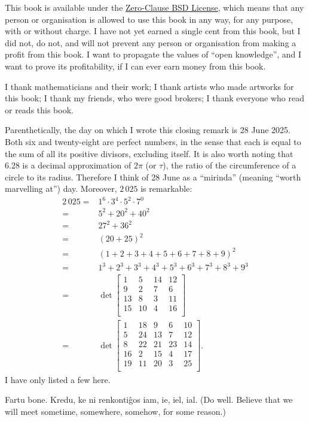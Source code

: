 \documentclass[../libro.tex]{subfiles}
\begin{document}
This book is available under
the \href{https://opensource.org/license/0bsd}{Zero-Clause BSD License},
which means that
any person or organisation is allowed to use this book
in any way, for any purpose, with or without charge.
I have not yet earned a single cent from this book,
but I did not, do not, and will not
prevent any person or organisation
from making a profit from this book.
I want to propagate the values of ``open knowledge'',
and I want to prove its profitability,
if I can ever earn money from this book.

I thank mathematicians and their work;
I thank artists who made artworks for this book;
I thank my friends, who were good brokers;
I thank everyone who read or reads this book.

Parenthetically, the day on which
I wrote this closing remark is 28 June 2025.
Both six and twenty-eight are perfect numbers,
in the sense that
each is equal to the sum of all its positive divisors,
excluding itself.
It is also worth noting that
\(6.28\) is a decimal approximation of \(2\pi\)
(or \(\tau\)),
the ratio of the circumference of a circle to its radius.
Therefore I think of 28 June as
a ``mirinda'' (meaning ``worth marvelling at'') day.
Moreover, \(2\,025\) is remarkable:
\begin{align*}
    2\,025
    = {} &
    1^6 \cdot 3^4 \cdot 5^2 \cdot 7^0
    \\
    = {} &
    5^2 + 20^2 + 40^2
    \\
    = {} &
    27^2 + 36^2
    \\
    = {} &
    (20 + 25)^2
    \\
    = {} &
    (1 + 2 + 3 + 4 + 5 + 6 + 7 + 8 + 9)^2
    \\
    = {} &
    1^3 + 2^3 + 3^3 + 4^3 + 5^3 + 6^3 + 7^3 + 8^3 + 9^3
    \\
    = {} &
    \det
    \begin{bmatrix}
        1  & 5  & 14 & 12 \\
        9  & 2  & 7  & 6  \\
        13 & 8  & 3  & 11 \\
        15 & 10 & 4  & 16 \\
    \end{bmatrix}
    \\
    = {} &
    \det
    \begin{bmatrix}
        1  & 18 & 9  & 6  & 10 \\
        5  & 24 & 13 & 7  & 12 \\
        8  & 22 & 21 & 23 & 14 \\
        16 & 2  & 15 & 4  & 17 \\
        19 & 11 & 20 & 3  & 25 \\
    \end{bmatrix}.
\end{align*}
I have only listed a few here.

Fartu bone. Kredu, ke ni renkontiĝos iam, ie, iel, ial.
(Do well. Believe that we will meet
sometime, somewhere, somehow, for some reason.)

\endgroup
\end{document}
